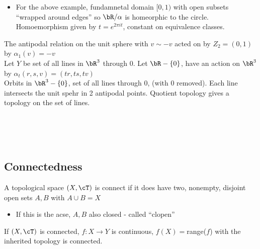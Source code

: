 \begin{itemize}
    \item For the above example, fundamnetal domain $[0,1)$ with open subsets ``wrapped around edges'' so $\bR/\alpha$ is homeorphic to the circle. Homoemorphism given by $t = e^{2\pi it}$, constant on equivalence classes. 
\end{itemize}

\begin{example}
    The antipodal relation on the unit sphere with $v \sim - v$ acted on by $Z_2 = (0,1)$ by $\alpha_1(v)=-v$ \\
    Let $Y$ be set of all lines in $\bR^3$ through 0. Let $\bR - \{0\}$, have an action on $\bR^3$ by $\alpha_t(r,s,v) = (tr, ts, tv)$ \\
    Orbits in $\bR^3-\{0\}$, set of all lines through 0, (with 0 removed). Each line intersects the unit spehr in 2 antipodal points. Quotient topology gives a topology on the set of lines. 
\end{example}

\mbox{} \\
\mbox{} \\
\mbox{} \\

\subsection{Connectedness}

\begin{definition}
    A topological space $(X, \cT)$ is connect if it does have two, nonempty, disjoint open sets $A,B$ with $A \cup B = X$
\end{definition}

\begin{itemize}
    \item If this is the acse, $A, B$ also closed - called ``clopen'' 
\end{itemize}

\begin{theorem}
    If $(X,\cT)$ is connected, $f: X \to Y$ is continuous, $f(X)=$range($f$) with the inherited topology is connected. 
\end{theorem}